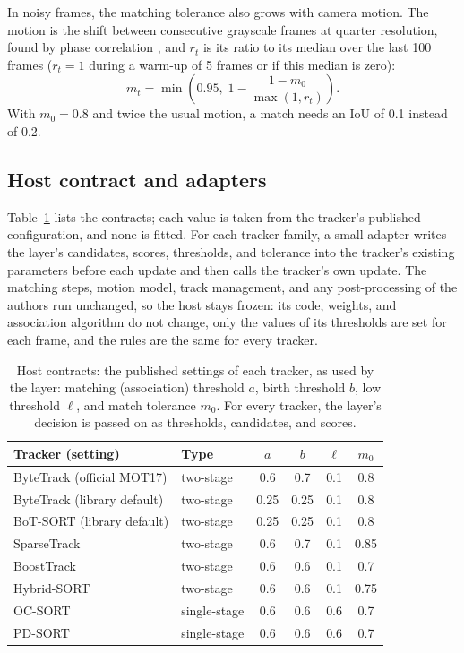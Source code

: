 \documentclass[pdflatex,sn-mathphys-num,iicol]{sn-jnl}
\begin{document}
In noisy frames, the matching tolerance also grows with camera motion. The motion is the shift
between consecutive grayscale frames at quarter resolution, found by phase correlation
\cite{reddy1996phasecorr}, and $r_t$ is its ratio to its median over the last 100 frames ($r_t=1$
during a warm-up of 5 frames or if this median is zero):
\begin{equation}
m_t=\min\!\left(0.95,\;1-\frac{1-m_0}{\max(1,r_t)}\right).
\label{eq:motion}
\end{equation}
With $m_0=0.8$ and twice the usual motion, a match needs an IoU of 0.1 instead of 0.2.

\subsection{Host contract and adapters}\label{sec:contract}
Table~\ref{tab:contracts} lists the contracts; each value is taken from the tracker's published
configuration, and none is fitted. For each tracker family, a small adapter writes the layer's
candidates, scores, thresholds, and tolerance into the tracker's existing parameters before each
update and then calls the tracker's own update. The matching steps, motion model, track
management, and any post-processing of the authors run unchanged, so the host stays frozen: its
code, weights, and association algorithm do not change, only the values of its thresholds are set
for each frame, and the rules are the same for every tracker.

\begin{table}[t]
\caption{Host contracts: the published settings of each tracker, as used by the layer: matching
(association) threshold $a$, birth threshold $b$, low threshold $\ell$, and match tolerance $m_0$.
For every tracker, the layer's decision is passed on as thresholds, candidates, and scores.}
\label{tab:contracts}
\centering\footnotesize
\setlength{\tabcolsep}{4pt}
\begin{tabular}{@{}>{\raggedright\arraybackslash}p{27mm}lcccc@{}}
\toprule
Tracker (setting) & Type & $a$ & $b$ & $\ell$ & $m_0$\\
\midrule
ByteTrack (official MOT17) & two-stage & 0.6 & 0.7 & 0.1 & 0.8\\
ByteTrack (library default) & two-stage & 0.25 & 0.25 & 0.1 & 0.8\\
BoT-SORT (library default) & two-stage & 0.25 & 0.25 & 0.1 & 0.8\\
SparseTrack & two-stage & 0.6 & 0.7 & 0.1 & 0.85\\
BoostTrack & two-stage & 0.6 & 0.6 & 0.1 & 0.7\\
Hybrid-SORT & two-stage & 0.6 & 0.6 & 0.1 & 0.75\\
OC-SORT & single-stage & 0.6 & 0.6 & 0.6 & 0.7\\
PD-SORT & single-stage & 0.6 & 0.6 & 0.6 & 0.7\\
\bottomrule
\end{tabular}
\end{table}
\end{document}
